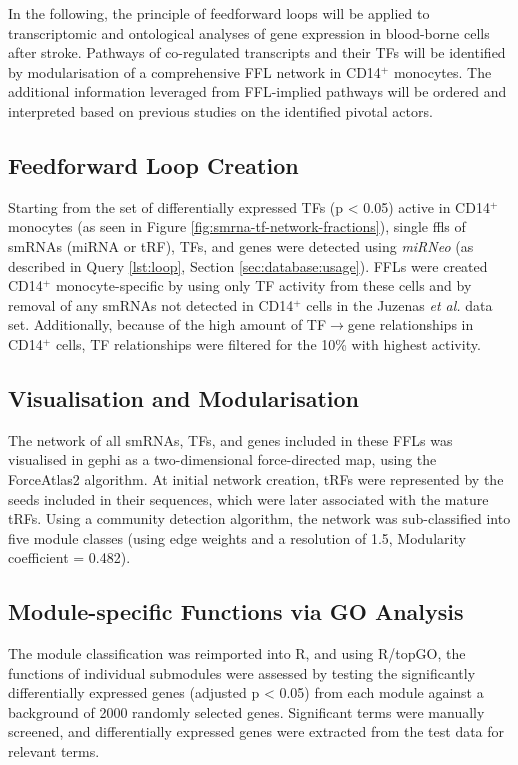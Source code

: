 In the following, the principle of feedforward loops will be applied to transcriptomic and ontological analyses of gene expression in blood-borne cells after stroke. Pathways of co-regulated transcripts and their TFs will be identified by modularisation of a comprehensive FFL network in CD14$^+$ monocytes. The additional information leveraged from FFL-implied pathways will be ordered and interpreted based on previous studies on the identified pivotal actors.

\begin{method}

\subsection{Feedforward Loop Creation}
Starting from the set of differentially expressed TFs (p < 0.05) active in CD14$^+$ monocytes (as seen in Figure \ref{fig:smrna-tf-network-fractions}), single \acfp{ffl} of smRNAs (miRNA or tRF), TFs, and genes were detected using \emph{miRNeo} (as described in Query \ref{lst:loop}, Section \ref{sec:database:usage}). FFLs were created CD14$^+$ monocyte-specific by using only TF activity from these cells and by removal of any smRNAs not detected in CD14$^+$ cells in the Juzenas \emph{et al.}\cite{Juzenas2017} data set. Additionally, because of the high amount of TF$\to$gene relationships in CD14$^+$ cells, TF relationships were filtered for the 10\% with highest activity.

\subsection{Visualisation and Modularisation}
The network of all smRNAs, TFs, and genes included in these FFLs was visualised in gephi\cite{Jacomy2014} as a two-dimensional force-directed map, using the ForceAtlas2 algorithm. At initial network creation, tRFs were represented by the seeds included in their sequences, which were later associated with the mature tRFs. Using a community detection algorithm\cite{Blondel2008}, the network was sub-classified into five module classes (using edge weights and a resolution of 1.5, Modularity coefficient = 0.482).

\subsection{Module-specific Functions via GO Analysis}
 The module classification was reimported into R, and using R/topGO,\cite{Alexa2006} the functions of individual submodules were assessed by testing the significantly differentially expressed genes (adjusted p < 0.05) from each module against a background of 2000 randomly selected genes. Significant terms were manually screened, and differentially expressed genes were extracted from the test data for relevant terms.

\end{method}

